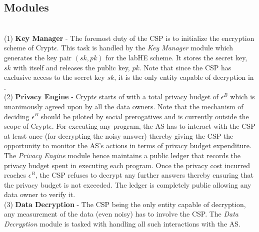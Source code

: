 \subsection{\system Modules}\label{sec:modules}

\\
(1)\textbf{ Key Manager }- The foremost duty of the \textsf{CSP} is to initialize the encryption scheme of Crypt$\epsilon$. This task is handled by the \textit{Key Manager} module which generates the key pair $(sk,pk)$ for the \textsf{labHE} scheme. It stores the secret key, $sk$ with itself and releases the public key, $pk$. Note that since the \textsf{CSP} has exclusive access to the secret key $sk$, it is the only entity capable of decryption in \system.\\
(2)\textbf{ Privacy Engine }- Crypt$\epsilon$ starts of with a total privacy budget of $\epsilon^B$ which is unanimously agreed upon by all the data owners. Note that the mechanism of deciding $\epsilon^B$ should be piloted by social prerogatives \cite{e1,e2}
and is currently outside the scope of Crypt$\epsilon$. For executing any program, the \textsf{AS} has to interact with the \textsf{CSP} at least once (for decrypting the noisy answer) thereby giving the \textsf{CSP} the opportunity to monitor the \textsf{AS}'s actions in terms of privacy budget expenditure. The \textit{Privacy Engine} module hence maintains a public ledger that records the privacy budget spent in executing each program. Once the privacy cost incurred reaches 
$\epsilon^B$, the \textsf{CSP} refuses to decrypt any further answers thereby ensuring that the privacy budget is not exceeded.  The ledger is completely public allowing any data owner to verify it.\\ %
(3)\textbf{ Data Decryption }- The \textsf{CSP} being the only entity capable of decryption,  any measurement of the data (even noisy) has to involve the \textsf{CSP}. The \textit{Data Decryption} module is tasked with handling all such interactions with the \textsf{AS}. 

